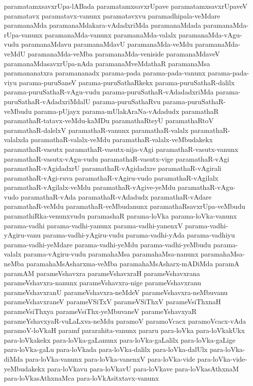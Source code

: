{paramatamxsavxrUpa-lABada
paramatamxsavxrUpave
paramatamxsavxrUpaveV
paramatavx
paramatavx-vanunx
paramatavxvu
paramadhipala-veMdare
paramanaMda
paramanaMdakara-vAdadxriMda
paramanaMdada
paramanaMda-rUpa-vanunx
paramanaMda-vanunx
paramanaMda-valalx
paramanaMda-vAgu-vudu
paramanaMdavu
paramanaMdavU
paramanaMda-veMdu
paramanaMda-veMdU
paramanaMda-veMba
paramanaMda-veniside
paramanaMdaveV
paramanaMdasavxrUpa-nAda
paramanaMveMdathaR
paramanaMsa
paramananatxra
paramananadx
parama-pada
parama-pada-vanunx
parama-pada-viyu
parama-puruSaneV
parama-puruSathaRkekx
parama-puruSathaR-dalilx
parama-puruSathaR-vAgu-vudu
parama-puruSathaR-vAdadadxriMda
parama-puruSathaR-vAdadxriMdalU
parama-puruSathaRvu
parama-puruSathaR-veMbudu
parama-pUjayx
parama-mUlakAraNa-vAdadudx
paramathaR
paramathaR-tatavx-veMdu-kaMDu
paramathaRteyU
paramathaRtoV
paramathaR-dalelxV
paramathaR-vanunx
paramathaR-valalx
paramathaR-valalxda
paramathaR-valalx-veMdu
paramathaR-valalx-veMbudakekx
paramathaR-vasutx
paramathaR-vasutx-nija-vAgi
paramathaR-vasutx-vanunx
paramathaR-vasutx-vAgu-vudu
paramathaR-vasutx-vige
paramathaR-vAgi
paramathaR-vAgidadxrU
paramathaR-vAgidadxre
paramathaR-vAgirali
paramathaR-vAgi-ruva
paramathaR-vAgiru-vudo
paramathaR-vAgilalx
paramathaR-vAgilalx-veMdu
paramathaR-vAgive-yeMdu
paramathaR-vAgu-vudo
paramathaR-vAda
paramathaR-vAdadudx
paramathaR-vAdare
paramathaR-veMdu
paramathaR-veMbudanunx
paramathaRsavxrUpa-veMbudu
paramathiRka-venunxvudu
paramashaR
parama-loVka
parama-loVka-vanunx
parama-vadhi
parama-vadhi-yanunx
parama-vadhi-yanenxV
parama-vadhi-yAgiru-vanu
parama-vadhi-yAgiru-vudu
parama-vadhi-yAda
parama-vadhiyu
parama-vadhi-yeMdare
parama-vadhi-yeMdu
parama-vadhi-yeMbudu
parama-valalx
parama-vAgiru-vudu
paramahaMsa
paramahaMsa-nanunx
paramahaMsa-neMba
paramahaMsAsharxma-veMba
paramahaMsAsharx-mADiMda
paramA
paramAM
parameVshavxra
parameVshavxraH
parameVshavxrana
parameVshavxra-nanunx
parameVshavxra-nige
parameVshavxranu
parameVshavxranU
parameVshavxra-neMdeV
parameVshavxra-neMbuvanu
parameVshavxraneV
parameVSiTxV
parameVSiThxV
parameVsiThxnaH
parameVsiThxya
parameVsiThx-yeMbuvaneV
parameYshavxyaR
parameYshavxyaR-vuLaLxva-neMdu
paramoV
paramoVcacx
paramoVcacx-vAda
paramoV-loVkaH
paramf
pararahita-vanunx
pararu
para-loVka
para-loVkakUkx
para-loVkakekx
para-loVka-gaLanunx
para-loVka-gaLalilx
para-loVka-gaLige
para-loVka-gaLu
para-loVkada
para-loVka-dalilx
para-loVka-dalUlx
para-loVka-diMda
para-loVka-vanunx
para-loVka-vanenxV
para-loVka-vide
para-loVka-vide-yeMbudakekx
para-loVkavu
para-loVkavU
para-loVkave
para-loVkasAthxnaM
para-loVkasAthxnaMca
para-loVkAsitxtavx-vanunx
}
